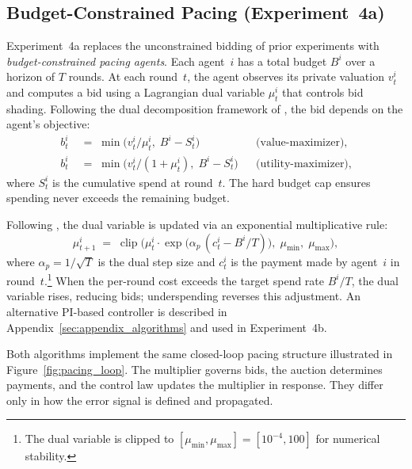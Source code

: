 \subsection{Budget-Constrained Pacing (Experiment~4a)}

Experiment~4a replaces the unconstrained bidding of prior experiments with \emph{budget-constrained pacing agents}. Each agent~$i$ has a total budget $B^i$ over a horizon of $T$ rounds. At each round~$t$, the agent observes its private valuation $v_t^i$ and computes a bid using a Lagrangian dual variable $\mu_t^i$ that controls bid shading. Following the dual decomposition framework of \citet{Balseiro2019Learning}, the bid depends on the agent's objective:
\begin{align}
b_t^i &\;=\; \min\!\bigl(v_t^i / \mu_t^i,\; B^i - S_t^i\bigr) & &\text{(value-maximizer),} \label{eq:bid_vmax_algo}\\
b_t^i &\;=\; \min\!\bigl(v_t^i / (1 + \mu_t^i),\; B^i - S_t^i\bigr) & &\text{(utility-maximizer),} \label{eq:bid_umax_algo}
\end{align}
where $S_t^i$ is the cumulative spend at round~$t$. The hard budget cap ensures spending never exceeds the remaining budget.

Following \citet{Balseiro2019Learning}, the dual variable is updated via an exponential multiplicative rule:
\begin{equation}
\mu_{t+1}^i \;=\; \operatorname{clip}\!\bigl(\mu_t^i \cdot \exp\!\bigl(\alpha_p\,(c_t^i - B^i/T)\bigr),\; \mu_{\min},\; \mu_{\max}\bigr),
\label{eq:dual_update}
\end{equation}
where $\alpha_p = 1/\!\sqrt{T}$ is the dual step size and $c_t^i$ is the payment made by agent~$i$ in round~$t$.\footnote{The dual variable is clipped to $[\mu_{\min}, \mu_{\max}] = [10^{-4}, 100]$ for numerical stability.} When the per-round cost exceeds the target spend rate $B^i/T$, the dual variable rises, reducing bids; underspending reverses this adjustment. An alternative PI-based controller is described in Appendix~\ref{sec:appendix_algorithms} and used in Experiment~4b.

Both algorithms implement the same closed-loop pacing structure illustrated in Figure~\ref{fig:pacing_loop}. The multiplier governs bids, the auction determines payments, and the control law updates the multiplier in response. They differ only in how the error signal is defined and propagated.

